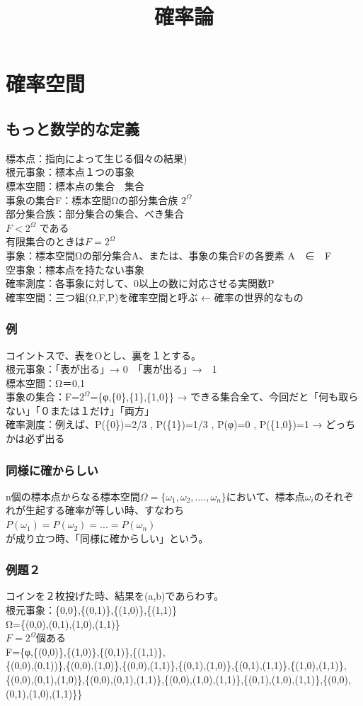 \documentclass{jsarticle}
\title{確率論}
\begin{document}
\section{確率空間}
	\subsection{もっと数学的な定義}
		標本点：指向によって生じる個々の結果) \\
		根元事象：標本点１つの事象 \\
		標本空間：標本点の集合　集合 \\
		事象の集合F：標本空間Ωの部分集合族 $2^Ω$ \\
		部分集合族：部分集合の集合、べき集合 \\
		$F < 2^Ω$ である \\
		有限集合のときは$F = 2^Ω$\\
		事象：標本空間Ωの部分集合A、または、事象の集合Fの各要素 A　∈　F\\
		空事象：標本点を持たない事象\\
		確率測度：各事象に対して、0以上の数に対応させる実関数P\\
		確率空間：三つ組(Ω,F,P)を確率空間と呼ぶ ← 確率の世界的なもの\\
		\subsubsection{例}
			コイントスで、表をOとし、裏を１とする。 \\
			根元事象：「表が出る」→ {0}　「裏が出る」→　{1} \\
			標本空間：Ω＝{0,1}\\
			事象の集合：F=$2^Ω$=\{φ,\{0\},\{1\},\{1,0\}\} → できる集合全て、今回だと「何も取らない」「０または１だけ」「両方」\\
			確率測度：例えば、P(\{0\})=2/3 , P(\{1\})=1/3 , P(φ)=0 , P(\{1,0\})=1 → どっちかは必ず出る\\
		\subsubsection{同様に確からしい}
		n個の標本点からなる標本空間$Ω=\{ω_1,ω_2,....,ω_n\}$において、標本点$ω_i$のそれぞれが生起する確率が等しい時、すなわち \\
		$P(ω_1)=P(ω_2)= ... =P(ω_n)$\\
		が成り立つ時、「同様に確からしい」という。
		\subsubsection{例題２}
			コインを２枚投げた時、結果を(a,b)であらわす。\\
			根元事象：\{0,0\},\{(0,1)\},\{(1,0)\},\{(1,1)\}\\
			Ω=\{(0,0),(0,1),(1,0),(1,1)\}\\
			$F=2^Ω$個ある\\
			F=\{φ,\{(0,0)\},\{(1,0)\},\{(0,1)\},\{(1,1)\},\\
			\{(0,0),(0,1))\},\{(0,0),(1,0)\},\{(0,0),(1,1)\},\{(0,1),(1,0)\},\{(0,1),(1,1)\},\{(1,0),(1,1)\},\\
			\{(0,0),(0,1),(1,0)\},\{(0,0),(0,1),(1,1)\},\{(0,0),(1,0),(1,1)\},\{(0,1),(1,0),(1,1)\},\{(0,0),(0,1),(1,0),(1,1)\}\}\\
\end{document}
